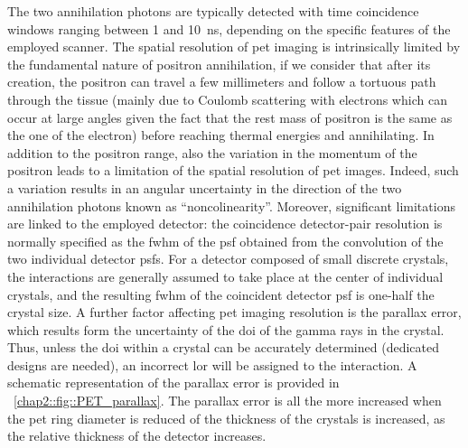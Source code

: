 The two annihilation photons are typically detected with time coincidence windows ranging between 1 and 10~ns, depending on the specific features of the employed scanner. The spatial resolution of \gls{pet} imaging is intrinsically limited by the fundamental nature of positron annihilation, if we consider that after its creation, the positron can travel a few millimeters and follow a tortuous path through the tissue (mainly due to Coulomb scattering with electrons which can occur at large angles given the fact that the rest mass of positron is the same as the one of the electron) before reaching thermal energies and annihilating. In addition to the positron range, also the variation in the momentum of the positron leads to a limitation of the spatial resolution of \gls{pet} images. Indeed, such a variation results in an angular uncertainty in the direction of the two annihilation photons known as \enquote{noncolinearity}. Moreover, significant limitations are linked to the employed detector: the coincidence detector-pair resolution is normally specified as the \gls{fwhm} of the \gls{psf} obtained from the convolution of the two individual detector \glspl{psf}. For a detector composed of small discrete crystals, the interactions are generally assumed to take place at the center of individual crystals, and the resulting \gls{fwhm} of the coincident detector \gls{psf} is one-half the crystal size. A further factor affecting \gls{pet} imaging resolution is the parallax error, which results form the uncertainty of the \gls{doi} of the gamma rays in the crystal. Thus, unless the \gls{doi} within a crystal can be accurately determined (dedicated designs are needed), an incorrect \gls{lor} will be assigned to the interaction. A schematic representation of the parallax error is provided in \figurename~\ref{chap2::fig::PET_parallax}. The parallax error is all the more increased when the \gls{pet} ring diameter is reduced of the thickness of the crystals is increased, as the relative thickness of the detector increases. 

